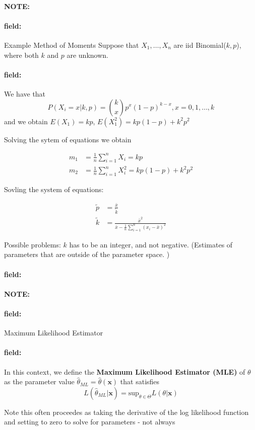 \documentclass[12pt]{article}
\newenvironment{note}{\paragraph{NOTE:}}{}
\newenvironment{field}{\paragraph{field:}}{}
\begin{document}
\begin{note}
  \begin{field}
    Example Method of Moments
    Suppose that $X_1, \ldots , X_n$ are iid Binomial($k,p$), where both $k$ and $p$ are unknown.
  \end{field}
  \begin{field}
    We have that
    $$ P(X_i = x|k,p) = \binom{k}{x}p^x(1-p)^{k-x}, x = 0,1,\ldots,k$$
     and we obtain $E(X_1) = kp$, $E(X_1^2) = kp(1-p) + k^2p^2$

    Solving the sytem of equations we obtain

    \begin{align*}
      m_1 &= \frac{1}{n} \sum _{i = 1}^n X_i = kp\\
      m_2 &= \frac{1}{n} \sum _{i = 1}^n X_i^2 = kp(1-p) + k^2p^2
    \end{align*}

    Sovling the system of equations:

    \begin{align*}
      \tilde{p} &= \frac{\bar{x}}{\tilde{k}}\\
      \tilde{k} &= \frac{\bar{x}^2}{\bar{x} - \frac{1}{n} \sum _{i = 1}^n (x_i - \bar{x})^2}
    \end{align*}

    Possible problems: $k$ has to be an integer, and not negative. (Estimates of parameters that are outside of the parameter space. )
  \end{field}
  \begin{field}

  \end{field}
\end{note}



\begin{note}
  \begin{field}
    Maximum Likelihood Estimator
  \end{field}
  \begin{field}
    In this context, we define the \textbf{Maximum Likelihood Estimator (MLE)} of $\theta$ as the parameter value $\hat{\theta}_{ML} = \hat{\theta}(\mathbf{x})$ that satisfies
    $$L(\hat{\theta}_{ML}|\mathbf{x}) = \text{sup}_{\theta \in \Theta} L(\theta|\mathbf{x})$$

    Note this often proceedes as taking the derivative of the log likelihood function and setting to zero to solve for parameters - not always
  \end{field}
\end{note}
\end{document}
